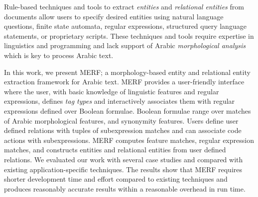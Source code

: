 Rule-based techniques and tools to extract {\em entities}  and {\em relational entities} from documents allow users to specify desired entities using natural language questions, finite state automata, regular expressions, structured query language statements, or proprietary scripts.  These techniques and tools require expertise in linguistics and programming and lack support of Arabic {\em morphological analysis} which is key to process Arabic text. 

In this work, we present MERF; a morphology-based entity and relational entity extraction framework for Arabic text.  MERF provides a user-friendly interface where the user, with basic knowledge of linguistic features and regular expressions, defines {\em tag types } and interactively associates them with regular expressions defined over Boolean formulae.  Boolean formulae range over matches of Arabic morphological features, and synonymity features.  Users define user defined relations with tuples of subexpression matches and can associate code actions with subexpressions.  MERF computes feature matches, regular expression matches, and constructs entities and relational entities from user defined relations.  We evaluated our work with several case studies and compared with existing application-specific techniques.  The results show that MERF requires shorter development time and effort compared to existing techniques and produces reasonably accurate results within a reasonable overhead in run time. 
